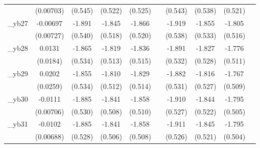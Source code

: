 \begin{table}[htbp]
\begin{tabular}{l*{9}{c}}
            &   (0.00703)         &     (0.545)         &     (0.522)         &     (0.525)         &                     &     (0.543)         &     (0.538)         &     (0.521)         &                     \\
[1em]
\_yb27       &    -0.00697         &      -1.891\sym{***}&      -1.845\sym{***}&      -1.866\sym{***}&                     &      -1.919\sym{***}&      -1.855\sym{***}&      -1.805\sym{***}&                     \\
            &   (0.00727)         &     (0.540)         &     (0.518)         &     (0.520)         &                     &     (0.538)         &     (0.533)         &     (0.516)         &                     \\
[1em]
\_yb28       &      0.0131         &      -1.865\sym{***}&      -1.819\sym{***}&      -1.836\sym{***}&                     &      -1.891\sym{***}&      -1.827\sym{***}&      -1.776\sym{***}&                     \\
            &    (0.0184)         &     (0.534)         &     (0.513)         &     (0.515)         &                     &     (0.532)         &     (0.528)         &     (0.511)         &                     \\
[1em]
\_yb29       &      0.0202         &      -1.855\sym{***}&      -1.810\sym{***}&      -1.829\sym{***}&                     &      -1.882\sym{***}&      -1.816\sym{***}&      -1.767\sym{***}&                     \\
            &    (0.0259)         &     (0.534)         &     (0.512)         &     (0.514)         &                     &     (0.531)         &     (0.527)         &     (0.509)         &                     \\
[1em]
\_yb30       &     -0.0111         &      -1.885\sym{***}&      -1.841\sym{***}&      -1.858\sym{***}&                     &      -1.910\sym{***}&      -1.844\sym{***}&      -1.795\sym{***}&                     \\
            &   (0.00706)         &     (0.530)         &     (0.508)         &     (0.510)         &                     &     (0.527)         &     (0.522)         &     (0.505)         &                     \\
[1em]
\_yb31       &     -0.0102         &      -1.885\sym{***}&      -1.841\sym{***}&      -1.858\sym{***}&                     &      -1.911\sym{***}&      -1.845\sym{***}&      -1.795\sym{***}&                     \\
            &   (0.00688)         &     (0.528)         &     (0.506)         &     (0.508)         &                     &     (0.526)         &     (0.521)         &     (0.504)         &                     \\

\end{tabular}
\end{table}
